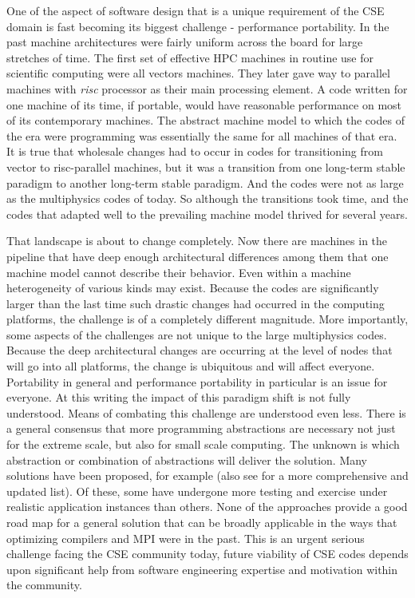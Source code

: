 \label{sec:future}

One of the aspect of software design that is a unique requirement of
the CSE domain is fast becoming its biggest challenge - performance
portability. In the past machine architectures were fairly uniform
across the board for large stretches of time. The first set of
effective HPC machines in routine use for scientific computing were
all vectors machines. They later gave way to parallel machines with
{\em risc} processor as their main processing element. A code written
for one machine of its time, if portable, would have reasonable
performance on most of its contemporary machines. The abstract machine
model to which the codes of the era were programming was essentially
the same for all machines of that era. It is true that wholesale changes had to occur
in codes for transitioning from vector to risc-parallel machines, but
it was a transition from one long-term stable paradigm to another
long-term stable paradigm. And the codes were not as large as the
multiphysics codes of today. So although the transitions took time, and the
codes that adapted well to the prevailing machine model thrived for
several years.  

That landscape is about to change completely. Now there are machines
in the pipeline that have deep enough architectural differences among
them that one machine model cannot describe their behavior. Even
within a machine heterogeneity of various kinds may exist. Because
the codes are significantly larger than the last time such drastic
changes had occurred in the computing platforms, the challenge is of a
completely different magnitude. More importantly, some aspects of the
challenges are not unique to the large multiphysics codes. Because the
deep architectural changes are occurring at the level of nodes that
will go into all platforms, the change is ubiquitous and will
affect everyone. Portability in general and performance
portability in particular is an issue for everyone. At this writing
the impact of this paradigm shift is not fully understood. Means of
combating this challenge are understood even less. There is a general
consensus that more programming abstractions are necessary not just
for the extreme scale, but also for small scale computing. The unknown
is which abstraction or combination of abstractions will deliver the
solution. Many solutions have been proposed, for example \cite{} (also
see \cite{IDEAS Howtos} for a more comprehensive and updated
list). Of these, some have undergone more testing and exercise under
realistic application instances than others. None of the approaches
provide a good road map for a general solution that can be broadly
applicable in the ways that optimizing compilers and MPI were
in the past. This is an urgent serious challenge facing the CSE
community today, future viability of CSE codes depends upon
significant help from software engineering expertise and motivation
within the community. 

